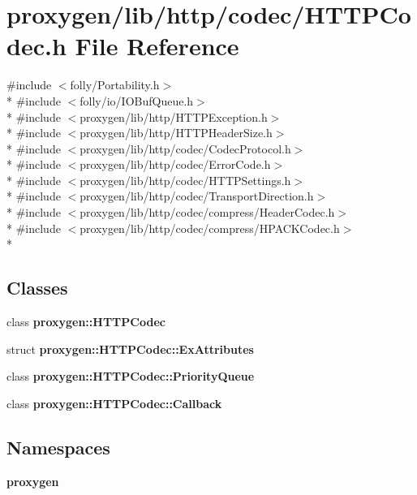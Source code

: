 \section{proxygen/lib/http/codec/\+H\+T\+T\+P\+Codec.h File Reference}
\label{HTTPCodec_8h}
{\ttfamily \#include $<$folly/\+Portability.\+h$>$}\\*
{\ttfamily \#include $<$folly/io/\+I\+O\+Buf\+Queue.\+h$>$}\\*
{\ttfamily \#include $<$proxygen/lib/http/\+H\+T\+T\+P\+Exception.\+h$>$}\\*
{\ttfamily \#include $<$proxygen/lib/http/\+H\+T\+T\+P\+Header\+Size.\+h$>$}\\*
{\ttfamily \#include $<$proxygen/lib/http/codec/\+Codec\+Protocol.\+h$>$}\\*
{\ttfamily \#include $<$proxygen/lib/http/codec/\+Error\+Code.\+h$>$}\\*
{\ttfamily \#include $<$proxygen/lib/http/codec/\+H\+T\+T\+P\+Settings.\+h$>$}\\*
{\ttfamily \#include $<$proxygen/lib/http/codec/\+Transport\+Direction.\+h$>$}\\*
{\ttfamily \#include $<$proxygen/lib/http/codec/compress/\+Header\+Codec.\+h$>$}\\*
{\ttfamily \#include $<$proxygen/lib/http/codec/compress/\+H\+P\+A\+C\+K\+Codec.\+h$>$}\\*
\subsection*{Classes}
\begin{DoxyCompactItemize}
\item 
class {\bf proxygen\+::\+H\+T\+T\+P\+Codec}
\item 
struct {\bf proxygen\+::\+H\+T\+T\+P\+Codec\+::\+Ex\+Attributes}
\item 
class {\bf proxygen\+::\+H\+T\+T\+P\+Codec\+::\+Priority\+Queue}
\item 
class {\bf proxygen\+::\+H\+T\+T\+P\+Codec\+::\+Callback}
\end{DoxyCompactItemize}
\subsection*{Namespaces}
\begin{DoxyCompactItemize}
\item 
 {\bf proxygen}
\end{DoxyCompactItemize}
